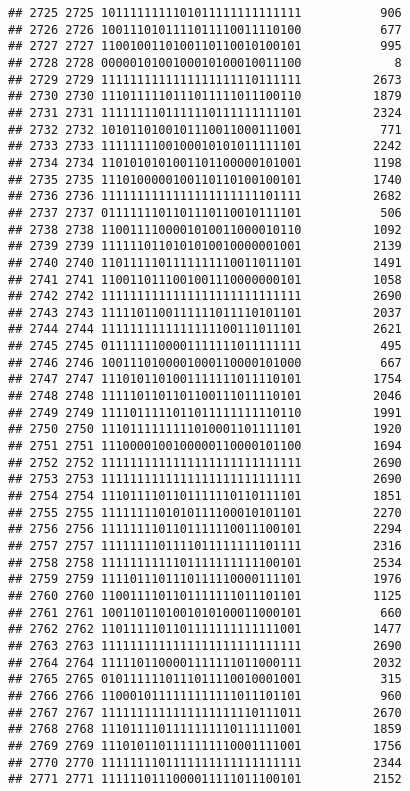 \documentclass[]{article}
\begin{document}
\begin{verbatim}
## 2725 2725 1011111111101011111111111111           906
## 2726 2726 1001110101111011110011110100           677
## 2727 2727 1100100110100110110010100101           995
## 2728 2728 0000010100100010100010011100             8
## 2729 2729 1111111111111111111110111111          2673
## 2730 2730 1110111110111011111011100110          1879
## 2731 2731 1111111101111110111111111101          2324
## 2732 2732 1010110100101110011000111001           771
## 2733 2733 1111111100100010101011111101          2242
## 2734 2734 1101010101001101100000101001          1198
## 2735 2735 1110100000100110110100100101          1740
## 2736 2736 1111111111111111111111101111          2682
## 2737 2737 0111111101101110110010111101           506
## 2738 2738 1100111100001010011000010110          1092
## 2739 2739 1111110110101010010000001001          2139
## 2740 2740 1101111101111111110011011101          1491
## 2741 2741 1100110111001001110000000101          1058
## 2742 2742 1111111111111111111111111111          2690
## 2743 2743 1111101100111111011110101101          2037
## 2744 2744 1111111111111111100111011101          2621
## 2745 2745 0111111100001111111011111111           495
## 2746 2746 1001110100001000110000101000           667
## 2747 2747 1110101101001111111011110101          1754
## 2748 2748 1111101101101100111011110101          2046
## 2749 2749 1111011111011011111111110110          1991
## 2750 2750 1110111111111010001101111101          1920
## 2751 2751 1110000100100000110000101100          1694
## 2752 2752 1111111111111111111111111111          2690
## 2753 2753 1111111111111111111111111111          2690
## 2754 2754 1110111101101111110110111101          1851
## 2755 2755 1111111101010111100010101101          2270
## 2756 2756 1111111101101111110011100101          2294
## 2757 2757 1111111101111011111111101111          2316
## 2758 2758 1111111111101111111111100101          2534
## 2759 2759 1111011101110111110000111101          1976
## 2760 2760 1100111101101111111011101101          1125
## 2761 2761 1001101101001010100011000101           660
## 2762 2762 1101111101101111111111111001          1477
## 2763 2763 1111111111111111111111111111          2690
## 2764 2764 1111101100001111111011000111          2032
## 2765 2765 0101111110111011110010001001           315
## 2766 2766 1100010111111111111011101101           960
## 2767 2767 1111111111111111111110111011          2670
## 2768 2768 1110111101111111110111111001          1859
## 2769 2769 1110101101111111110001111001          1756
## 2770 2770 1111111101111111111111111111          2344
## 2771 2771 1111110111000011111011100101          2152

\end{verbatim}
\end{document}
